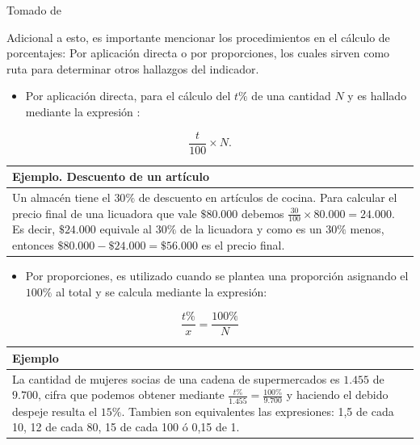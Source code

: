 \documentclass[
]{book}
\providecommand{\tightlist}{%
  \setlength{\itemsep}{0pt}\setlength{\parskip}{0pt}}
\begin{document}
Tomado de \citep{BibEntry244021Mar}

Adicional a esto, es importante mencionar los procedimientos en el cálculo de porcentajes: Por aplicación directa o por proporciones, los cuales sirven como ruta para determinar otros hallazgos del indicador.

\begin{itemize}
\tightlist
\item
  Por aplicación directa, para el cálculo del \(t\%\) de una cantidad \(N\) y es hallado mediante la expresión :
\end{itemize}

\[\begin{equation}
\frac{t}{100}\times N.
\end{equation}\]

\begin{longtable}[]{@{}l@{}}
\toprule
\begin{minipage}[b]{0.97\columnwidth}\raggedright
Ejemplo. Descuento de un artículo\strut
\end{minipage}\tabularnewline
\midrule
\endhead
\begin{minipage}[t]{0.97\columnwidth}\raggedright
Un almacén tiene el \(30\%\) de descuento en artículos de cocina. Para calcular el precio final de una licuadora que vale \(\$80.000\) debemos \(\frac{30}{100}\times 80.000=24.000.\) Es decir, \(\$24.000\) equivale al \(30\%\) de la licuadora y como es un \(30\%\) menos, entonces \(\$80.000-\$24.000=\$56.000\) es el precio final.\strut
\end{minipage}\tabularnewline
\bottomrule
\end{longtable}

\begin{itemize}
\tightlist
\item
  Por proporciones, es utilizado cuando se plantea una proporción asignando el \(100\%\) al total y se calcula mediante la expresión:
\end{itemize}

\[\begin{equation}
\frac{t\%}{x}=\frac{100\%}{N}
\end{equation}\]

\begin{longtable}[]{@{}l@{}}
\toprule
\begin{minipage}[b]{0.97\columnwidth}\raggedright
Ejemplo\strut
\end{minipage}\tabularnewline
\midrule
\endhead
\begin{minipage}[t]{0.97\columnwidth}\raggedright
La cantidad de mujeres socias de una cadena de supermercados es \(1.455\) de \(9.700\), cifra que podemos obtener mediante \(\frac{t\%}{1.455}=\frac{100\%}{9.700}\) y haciendo el debido despeje resulta el \(15\%\). Tambien son equivalentes las expresiones: 1,5 de cada 10, 12 de cada 80, 15 de cada 100 ó 0,15 de 1.\strut
\end{minipage}\tabularnewline
\bottomrule
\end{longtable}
\end{document}

